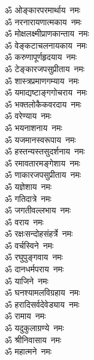 \begin{multicols}{2}
    \begin{flushleft}
        ॐ ओङ्कारपरमार्थाय~नमः\\
        ॐ नरनारायणात्मकाय~नमः\\
        ॐ मोक्षलक्ष्मीप्राणकान्ताय~नमः\\
        ॐ वेङ्कटाचलनायकाय~नमः\\
        ॐ करुणापूर्णहृदयाय~नमः\\
        ॐ टेङ्कारजपसुप्रीताय~नमः\\
        ॐ शास्त्रप्रमाणगम्याय~नमः\\
        ॐ यमाद्यष्टाङ्गगोचराय~नमः\\
        ॐ भक्तलोकैकवरदाय~नमः\\
        ॐ वरेण्याय~नमः\hfill{}\\
                                                        
        ॐ भयनाशनाय~नमः\\
        ॐ यजमानस्वरूपाय~नमः\\
        ॐ हस्तन्यस्तसुदर्शनाय~नमः\\
        ॐ रमावतारमङ्गेशाय~नमः\\
        ॐ णाकारजपसुप्रीताय~नमः\\
        ॐ यज्ञेशाय~नमः\\
        ॐ गतिदात्रे~नमः\\
        ॐ जगतीवल्लभाय~नमः\\
        ॐ वराय~नमः\\
        ॐ रक्षःसन्दोहसंहर्त्रे~नमः\hfill{}\\
                                                        
        ॐ वर्चस्विने~नमः\\
        ॐ रघुपुङ्गवाय~नमः\\
        ॐ दानधर्मपराय~नमः\\
        ॐ याजिने~नमः\\
        ॐ घनश्यामलविग्रहाय~नमः\\
        ॐ हरादिसर्वदेवेड्याय~नमः\\
        ॐ रामाय~नमः\\
        ॐ यदुकुलाग्रण्ये~नमः\\
        ॐ श्रीनिवासाय~नमः\\
        ॐ महात्मने~नमः\hfill{}\\
                                                        

\end{flushleft}
\end{multicols}
